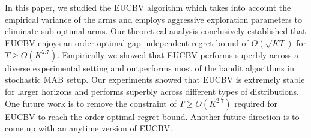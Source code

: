 In this paper, we studied the EUCBV algorithm which takes into account the empirical variance of the arms and employs aggressive exploration parameters to eliminate sub-optimal arms. Our theoretical analysis conclusively established that EUCBV enjoys an order-optimal gap-independent regret bound of $O\left(\sqrt{KT}\right)$ for $T\geq O\left( K^{2.7}\right)$. Empirically we showed that EUCBV performs superbly across a diverse experimental setting and outperforms most of the bandit algorithms in stochastic  MAB setup. Our experiments showed that EUCBV is extremely stable for larger horizons and performs superbly  across different types of distributions. One future work is to remove the constraint of $T\geq O\left( K^{2.7}\right)$ required for EUCBV to reach the order optimal regret bound. Another future direction is to come up with an anytime version of EUCBV. 